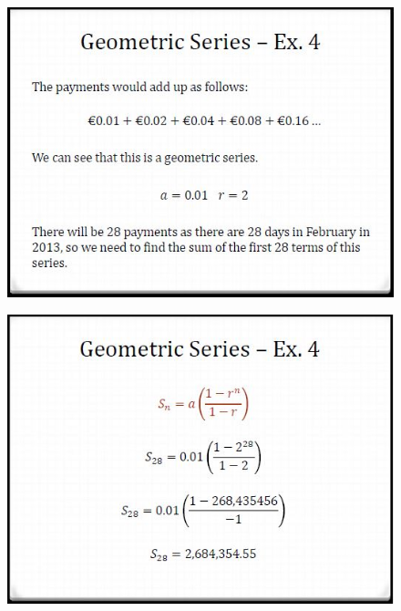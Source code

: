 \documentclass{beamer}
\begin{document}
\begin{frame}
	\begin{figure}
		\centering
		\includegraphics[width=0.99\linewidth]{SeqSer21A}
	\end{figure}
	
\end{frame}	
\begin{frame}
	\begin{figure}
		\centering
		\includegraphics[width=0.99\linewidth]{SeqSer21B}
	\end{figure}
	
\end{frame}
\end{document}

